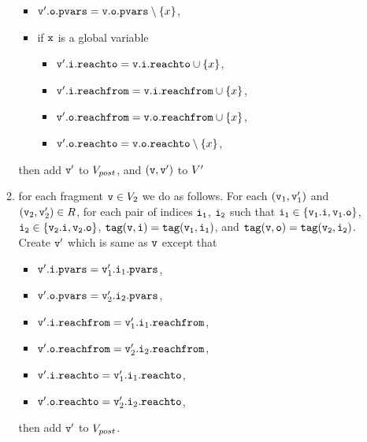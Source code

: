 \begin{itemize}
\begin{enumerate}
\begin{itemize}
\item $\mathtt{v}'.\mathtt{o}.\mathtt{pvars} = \mathtt{v}.\mathtt{o}.\mathtt{pvars} \setminus \left\{x\right\}$,
\item if $\mathtt{x}$ is a global variable
\begin{itemize}
\item $\mathtt{v}'.\mathtt{i}.\mathtt{reachto} = \mathtt{v}.\mathtt{i}.\mathtt{reachto} \cup \left\{x\right\}$,
 \item $\mathtt{v}'.\mathtt{i}.\mathtt{reachfrom} = \mathtt{v}.\mathtt{i}.\mathtt{reachfrom} \cup \left\{x\right\}$,
\item $\mathtt{v}'.\mathtt{o}.\mathtt{reachfrom} = \mathtt{v}.\mathtt{o}.\mathtt{reachfrom} \cup \left\{x\right\}$,
\item $\mathtt{v}'.\mathtt{o}.\mathtt{reachto} = \mathtt{v}.\mathtt{o}.\mathtt{reachto} \setminus \left\{x\right\}$,
\end{itemize}
\end{itemize}
then add $\tt v'$ to $V_{post}$, and $\tt (v,v')$ to $V'$
\item for each fragment $\mathtt{v} \in V_2$ we do as follows. For each $(\mathtt{v}_1,\mathtt{v}_1')$ and $(\mathtt{v}_2,\mathtt{v}_2') \in R$, for each pair of indices $\tt i_1$, $\tt i_2$ such that $\tt i_1 \in \{\mathtt{v}_1.i, \mathtt{v}_1.o\}$, $\tt i_2 \in \{\mathtt{v}_2.i, \mathtt{v}_2.o\}$, $\tt tag(v,i) = tag(\mathtt{v}_1, i_1)$, and $\tt tag(v,o) = tag(\mathtt{v}_2, i_2)$.
 Create $\tt v'$ which is same as $\tt v$ except that 
\begin{itemize}
\item $\mathtt{v}'.\mathtt{i}.\mathtt{pvars} = \mathtt{v}_1'.\mathtt{i}_1.\mathtt{pvars}$,
\item $\mathtt{v}'.\mathtt{o}.\mathtt{pvars} = \mathtt{v}_2'.\mathtt{i}_2.\mathtt{pvars}$,
\item $\mathtt{v}'.\mathtt{i}.\mathtt{reachfrom} = \mathtt{v}_1'.\mathtt{i}_1.\mathtt{reachfrom}$,
\item $\mathtt{v}'.\mathtt{o}.\mathtt{reachfrom} = \mathtt{v}_2'.\mathtt{i}_2.\mathtt{reachfrom}$,
\item $\mathtt{v}'.\mathtt{i}.\mathtt{reachto} = \mathtt{v}_1'.\mathtt{i}_1.\mathtt{reachto}$,
\item $\mathtt{v}'.\mathtt{o}.\mathtt{reachto} =  \mathtt{v}_2'.\mathtt{i}_2.\mathtt{reachto}$,
\end{itemize} then add $\tt v'$ to $V_{post}$. 
\end{enumerate}

\end{itemize}
